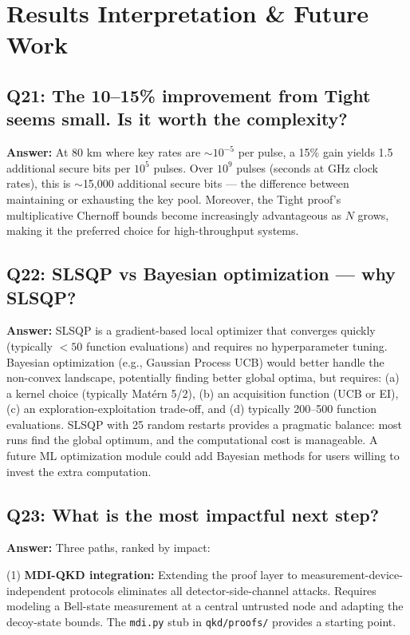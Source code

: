 \documentclass[11pt,a4paper,oneside]{report}
\begin{document}
\section{Results Interpretation \& Future Work}

\subsection*{Q21: The 10–15\% improvement from Tight seems small. Is it worth the complexity?}
\textbf{Answer:} At 80 km where key rates are $\sim 10^{-5}$ per pulse, a 15\% gain yields 1.5 additional secure bits per $10^5$ pulses. Over $10^9$ pulses (seconds at GHz clock rates), this is $\sim$15,000 additional secure bits — the difference between maintaining or exhausting the key pool. Moreover, the Tight proof's multiplicative Chernoff bounds become increasingly advantageous as $N$ grows, making it the preferred choice for high-throughput systems.

\subsection*{Q22: SLSQP vs Bayesian optimization — why SLSQP?}
\textbf{Answer:} SLSQP is a gradient-based local optimizer that converges quickly (typically $< 50$ function evaluations) and requires no hyperparameter tuning. Bayesian optimization (e.g., Gaussian Process UCB) would better handle the non-convex landscape, potentially finding better global optima, but requires: (a) a kernel choice (typically Mat\'{e}rn 5/2), (b) an acquisition function (UCB or EI), (c) an exploration-exploitation trade-off, and (d) typically 200–500 function evaluations. SLSQP with 25 random restarts provides a pragmatic balance: most runs find the global optimum, and the computational cost is manageable. A future ML optimization module could add Bayesian methods for users willing to invest the extra computation.

\subsection*{Q23: What is the most impactful next step?}
\textbf{Answer:} Three paths, ranked by impact:

(1) \textbf{MDI-QKD integration:} Extending the proof layer to measurement-device-independent protocols eliminates all detector-side-channel attacks. Requires modeling a Bell-state measurement at a central untrusted node and adapting the decoy-state bounds. The \texttt{mdi.py} stub in \texttt{qkd/proofs/} provides a starting point.
\end{document}
